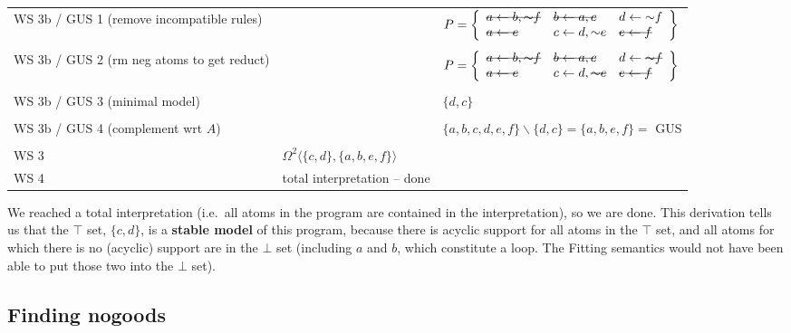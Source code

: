 \documentclass[9pt,a4paper,landscape]{article}
\newcommand{\msout}[1]{\text{\sout{$#1$}}}
\begin{document}
{\begin{center}
\begin{tabular}{p{5cm}p{5cm}p{7cm}}
		WS 3b / GUS 1 (remove incompatible rules) 
		&
		& $P = \left\{\begin{array}{lll}
		\msout{a \leftarrow b, {\sim} f} & \msout{b \leftarrow a, c} & d \leftarrow {\sim} f\\
		\msout{a \leftarrow e} & c \leftarrow d, {\sim} e & \msout{e \leftarrow f}
		\end{array}\right\}$ \\ &\\
		WS 3b / GUS 2 (rm neg atoms to get reduct) 
		& 
		& $P = \left\{\begin{array}{lll}
		\msout{a \leftarrow b, {\sim} f} & \msout{b \leftarrow a, c} & d \leftarrow \msout{{\sim} f}\\
		\msout{a \leftarrow e} & c \leftarrow d, \msout{{\sim} e} & \msout{e \leftarrow f}
		\end{array}\right\}$ \\ &\\
		WS 3b / GUS 3 (minimal model) 
		& 
		& $\{ d, c \}$ \\ &\\
		WS 3b / GUS 4 (complement wrt $A$) 
		&
		&  $\{a, b, c, d, e, f\} \backslash \{d, c\} = \{a, b, e, f\} = $ GUS  \\&\\
		WS 3 
		& $\Omega^2 \langle \{c, d\}, \{a, b, e, f\} \rangle$& \\ \midrule
		WS 4 & total interpretation -- done & \\ \midrule
	\end{tabular}
\end{center}

We reached a total interpretation (i.e.\ all atoms in the program are contained in the interpretation), so we are done.
This derivation tells us that the $\top$ set, $\{c, d\}$, is a \textbf{stable model} of this program, because there is acyclic support for all atoms in the $\top$ set, and all atoms for which there is no (acyclic) support are in the $\bot$ set (including $a$ and $b$, which constitute a loop. The Fitting semantics would not have been able to put those two into the $\bot$ set).

\pagebreak


\subsection{Finding nogoods}
\label{subsec:ng}

}
\end{document}
